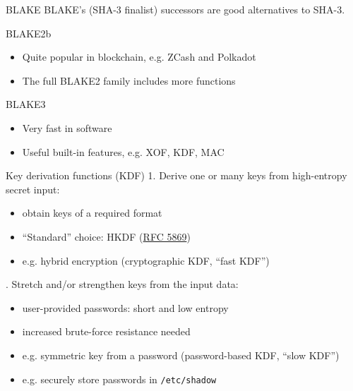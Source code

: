\begin{frame}{BLAKE}
  BLAKE's (SHA-3 finalist) successors are good alternatives to SHA-3.

  \vspace*{1em}

  \pause
  BLAKE2b
  \begin{itemize}
    \item Quite popular in blockchain, e.g. ZCash and Polkadot
    \item The full BLAKE2 family includes more functions
  \end{itemize}

  \pause
  BLAKE3
  \begin{itemize}
    \item Very fast in software
    \item Useful built-in features, e.g. XOF, KDF, MAC
  \end{itemize}
\end{frame}

\begin{frame}{Key derivation functions (KDF)}
  1. Derive one or many keys from high-entropy secret input:
  \begin{itemize}[<+(1)->]
    \item obtain keys of a required format
    \item \enquote{Standard} choice: HKDF (\href{https://datatracker.ietf.org/doc/html/rfc5869}{RFC 5869})
    \item e.g. hybrid encryption (cryptographic KDF, \enquote{fast KDF})
  \end{itemize}

  \vspace*{1em}

  . Stretch and/or strengthen keys from the input data:
  \begin{itemize}[<+(1)->]
    \item user-provided passwords: short and low entropy
    \item increased brute-force resistance needed
    \item e.g. symmetric key from a password (password-based KDF, \enquote{slow KDF})
    \item e.g. securely store passwords in \texttt{/etc/shadow}
  \end{itemize}
\end{frame}

